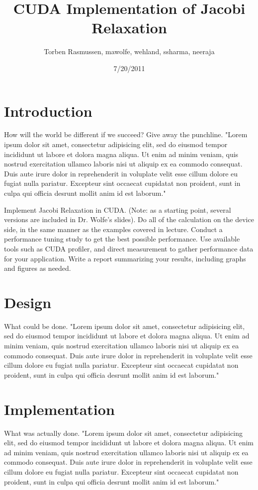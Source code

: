 \documentclass[11pt, twocolumn]{article}
\title{CUDA Implementation of Jacobi Relaxation}
\author{Torben Rasmussen, mawolfe, wehland, ssharma, neeraja}
\date{7/20/2011}
\begin{document}
\maketitle

\section{Introduction} %
How will the world be different if we succeed?
Give away the punchline.
"Lorem ipsum dolor sit amet, consectetur adipisicing elit, sed do eiusmod tempor incididunt ut labore et dolora magna aliqua.  Ut enim ad minim veniam, quis nostrud exercitation ullamco laboris nisi ut aliquip ex ea commodo consequat.  Duis aute irure dolor in reprehenderit in voluplate velit esse cillum dolore eu fugiat nulla pariatur.  Excepteur sint occaecat cupidatat non proident, sunt in culpa qui officia desrunt mollit anim id est laborum."

Implement Jacobi Relaxation in CUDA.  
(Note: as a starting point, several versions are included in Dr. Wolfe's slides).
Do all of the calculation on the device side, in the same manner as the examples covered in lecture.
Conduct a performance tuning study to get the best possible performance.
Use available tools such as CUDA profiler, and direct measurement to gather performance data for your application.
Write a report summarizing your results, including graphs and figures as needed.

\section{Design}
What could be done.
"Lorem ipsum dolor sit amet, consectetur adipisicing elit, sed do eiusmod tempor incididunt ut labore et dolora magna aliqua.  Ut enim ad minim veniam, quis nostrud exercitation ullamco laboris nisi ut aliquip ex ea commodo consequat.  Duis aute irure dolor in reprehenderit in voluplate velit esse cillum dolore eu fugiat nulla pariatur.  Excepteur sint occaecat cupidatat non proident, sunt in culpa qui officia desrunt mollit anim id est laborum."

\section{Implementation}
What was actually done.
"Lorem ipsum dolor sit amet, consectetur adipisicing elit, sed do eiusmod tempor incididunt ut labore et dolora magna aliqua.  Ut enim ad minim veniam, quis nostrud exercitation ullamco laboris nisi ut aliquip ex ea commodo consequat.  Duis aute irure dolor in reprehenderit in voluplate velit esse cillum dolore eu fugiat nulla pariatur.  Excepteur sint occaecat cupidatat non proident, sunt in culpa qui officia desrunt mollit anim id est laborum."
\end{document}
